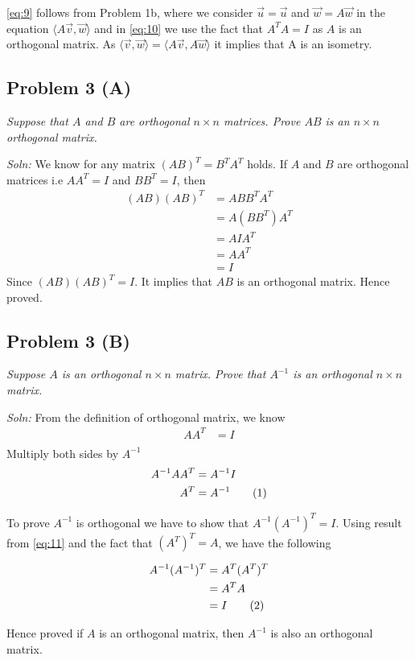 \documentclass[12pt,a4paper]{article}
\newcommand\numberthis{\addtocounter{equation}{1}\tag{\theequation}}
\begin{document}
    \eqref{eq:9} follows from Problem 1b, where we consider $\vec{u} = \vec{u}$ and $\vec{w} = A\vec{w}$ in the equation $\langle A\vec{v}, \vec{w} \rangle$ and in \eqref{eq:10} we use the fact that $A^TA = I$ as $A$ is an orthogonal matrix. As $\langle \vec{v}, \vec{w} \rangle = \langle A\vec{v}, A\vec{w} \rangle$ it implies that A is an isometry.
    
    \newpage
    \subsection*{Problem 3 (A)}
    \textit{
        Suppose that $A$ and $B$ are orthogonal $n \times n$ matrices. Prove $AB$ is an $n \times n$ orthogonal matrix.
    }
    
    \noindent\textit{Soln: }We know for any matrix $(AB)^T = B^TA^T$ holds. If $A$ and $B$ are orthogonal matrices i.e $AA^T=I$ and $BB^T=I$, then 
    \begin{align*}
        (AB)(AB)^T &= ABB^TA^T \\
                   &= A(BB^T)A^T \\
                   &= AIA^T \\
                   &= AA^T \\
                   &= I
    \end{align*}
    Since $(AB)(AB)^T = I$. It implies that $AB$ is an orthogonal matrix. Hence proved.
    
    \subsection*{Problem 3 (B)}
    \textit{
        Suppose $A$ is an orthogonal $n \times n$ matrix. Prove that $A^{-1}$ is an orthogonal $n \times n$ matrix.
    }
    
    \noindent\textit{Soln: }From the definition of orthogonal matrix, we know
    \begin{align*}
        AA^T &= I \\
    \end{align*}
    \indent Multiply both sides by $A^{-1}$
    \begin{align*}
        A^{-1}AA^T &= A^{-1}I \\
        A^T &= A^{-1} \numberthis \label{eq:11}
    \end{align*}
    
    To prove $A^{-1}$ is orthogonal we have to show that $A^{-1}(A^{-1})^T = I$. Using result from \eqref{eq:11} and the fact that $(A^T)^T = A$, we have the following
    
    \begin{align*}
        A^{-1}(A^{-1})^T &= A^T(A^T)^T \\
                         &= A^TA \\
                         &= I \numberthis \label{eq:12}
    \end{align*}
    
    Hence proved if $A$ is an orthogonal matrix, then $A^{-1}$ is also an orthogonal matrix.
    
\end{document}
